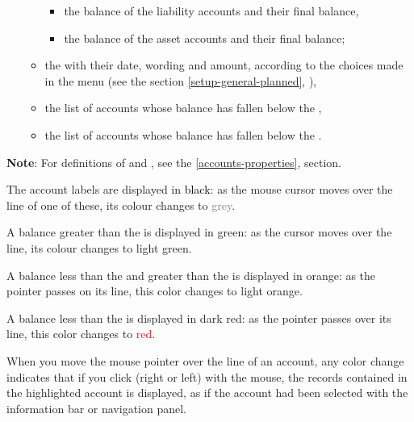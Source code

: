 \begin{itemize}
\begin{itemize}
\begin{itemize}
			\item the balance of the liability accounts and their final balance,
			\item the balance of the asset accounts and their final balance;
		\end{itemize}
	\item the  with their date, wording and amount, according to the choices made in the  menu (see the section \vref{setup-general-planned}, ),
	\item the list of accounts whose balance has fallen below the ,
	\item the list of accounts whose balance has fallen below the .
	\end{itemize}
\end{itemize}


\textbf{Note}: For definitions of  and , see the \vref{accounts-properties},  section.


The account labels are displayed in \textcolor{black}{black}: as the mouse cursor moves over the line of one of these, its colour changes to \textcolor{gray}{grey}.

A balance greater than the  is displayed in \textcolor[RGB]{0,126,0}{green}: as the cursor moves over the line, its colour changes to \textcolor[RGB]{0,227,0}{light green}.

A balance less than the  and greater than the  is displayed in \textcolor[RGB]{230,155,0}{orange}: as the pointer passes on its line, this color changes to \textcolor[RGB]{255,200,0}{light orange}.

A balance less than the    is displayed in \textcolor[RGB]{153,0,0}{dark red}: as the pointer passes over its line, this color changes to \textcolor{red}{red}.

When you move the mouse pointer over the line of an account, any color change indicates that if you click (right or left) with the mouse, the records contained in the highlighted account is displayed, as if the account had been selected with the information bar or navigation panel.

